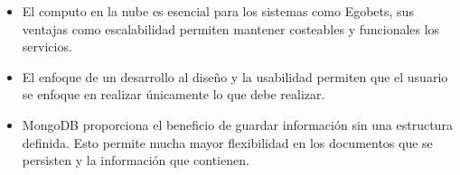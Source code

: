 \begin{itemize}
\item El computo en la nube es esencial para los sistemas como Egobets, sus ventajas como escalabilidad permiten mantener costeables y funcionales los servicios.

\item El enfoque de un desarrollo al diseño y la usabilidad permiten que el usuario se enfoque en realizar únicamente lo que debe realizar.

\item MongoDB proporciona el beneficio de guardar información sin una estructura definida. Esto permite mucha mayor flexibilidad en los documentos que se persisten y la información que contienen\cite{puniaimplementing}.

\end{itemize}

%
%
%
%
%
%

